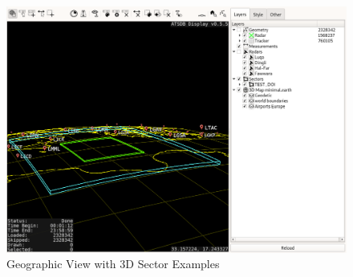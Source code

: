 \begin{figure}[H]
    \hspace*{-2.5cm}
    \includegraphics[width=19cm]{figures/geoview_sectors3d.png}
  \caption{Geographic View with 3D Sector Examples}
\end{figure}
